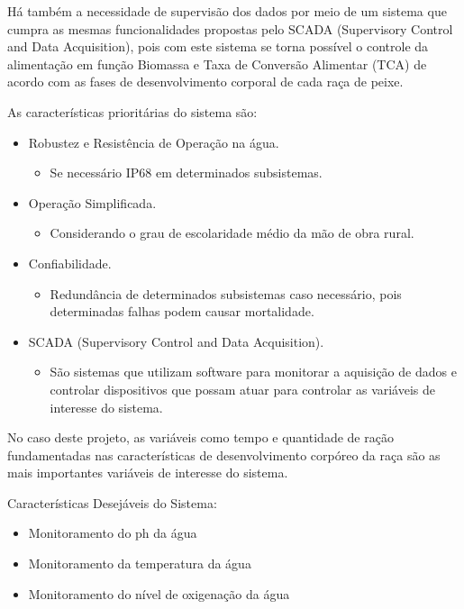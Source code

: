 Há também a necessidade  de supervisão dos dados por meio de um sistema que cumpra as mesmas funcionalidades propostas pelo SCADA (Supervisory Control and Data Acquisition), pois com este sistema se torna possível o controle da alimentação em função Biomassa e Taxa de Conversão Alimentar (TCA) de acordo com as fases de desenvolvimento corporal de cada raça de peixe.

As características prioritárias do sistema são:
\begin{itemize}
  \item Robustez e Resistência de Operação na água.
    \begin{itemize}
      \item Se necessário IP68 em determinados subsistemas.
    \end{itemize}
  \item Operação Simplificada.
    \begin{itemize}
      \item Considerando o grau de escolaridade médio da mão de obra rural.
    \end{itemize}
  \item Confiabilidade.
    \begin{itemize}
      \item Redundância de determinados subsistemas caso necessário, pois determinadas falhas podem causar mortalidade.
    \end{itemize}
  \item SCADA (Supervisory Control and Data Acquisition).
   \begin{itemize}
     \item São sistemas que utilizam software para monitorar a aquisição de dados e controlar dispositivos que possam atuar para controlar as variáveis de interesse do sistema.
   \end{itemize}
\end{itemize}

No caso deste projeto, as variáveis como tempo e quantidade de ração fundamentadas nas características de desenvolvimento corpóreo da raça são as mais importantes variáveis de interesse do sistema.

Características Desejáveis do Sistema:
\begin{itemize}
  \item Monitoramento do ph da água
  \item Monitoramento da temperatura da água
  \item Monitoramento do nível de oxigenação da água
\end{itemize}

